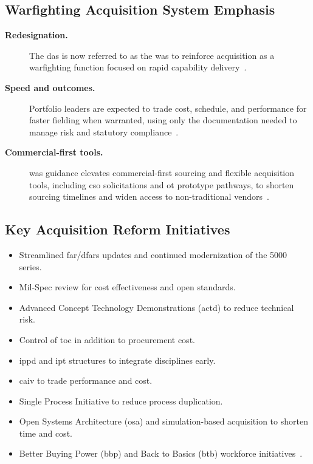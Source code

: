 \documentclass[../main.tex]{subfiles}
\begin{document}
\subsection{Warfighting Acquisition System Emphasis}
\begin{description}
  \item[\textbf{Redesignation.}] The \ac{das} is now referred to as the \ac{was} to reinforce acquisition as a warfighting function focused on rapid capability delivery~\autocite{secwar-was-memo-2025}.
  \item[\textbf{Speed and outcomes.}] Portfolio leaders are expected to trade cost, schedule, and performance for faster fielding when warranted, using only the documentation needed to manage risk and statutory compliance~\autocite{secwar-was-memo-2025,secwar-acq-transformation-2025}.
  \item[\textbf{Commercial-first tools.}] \ac{was} guidance elevates commercial-first sourcing and flexible acquisition tools, including \ac{cso} solicitations and \ac{ot} prototype pathways, to shorten sourcing timelines and widen access to non-traditional vendors~\autocite{secwar-was-memo-2025,DIU-Work-With-Us-2026,USC-4022-OTF}.
\end{description}

\subsection{Key Acquisition Reform Initiatives}
\begin{itemize}
  \item Streamlined \ac{far}/\ac{dfars} updates and continued modernization of the 5000 series.
  \item Mil-Spec review for cost effectiveness and open standards.
  \item Advanced Concept Technology Demonstrations (\ac{actd}) to reduce technical risk.
  \item Control of \ac{toc} in addition to procurement cost.
  \item \ac{ippd} and \ac{ipt} structures to integrate disciplines early.
  \item \ac{caiv} to trade performance and cost.
  \item Single Process Initiative to reduce process duplication.
  \item Open Systems Architecture (\ac{osa}) and simulation-based acquisition to shorten time and cost.
  \item Better Buying Power (\ac{bbp}) and Back to Basics (\ac{btb}) workforce initiatives~\autocite{edo-3-3-1-acq-policy-players-2025}.
\end{itemize}
\end{document}
